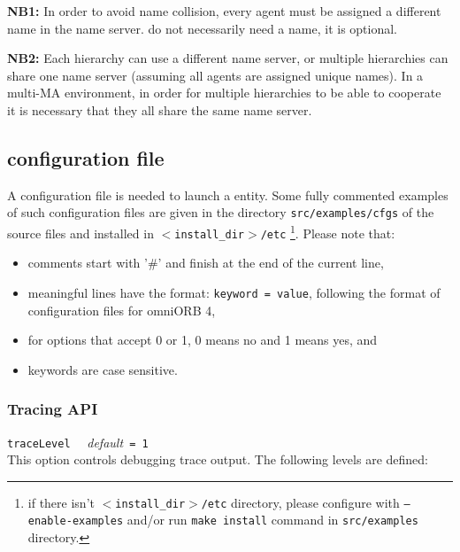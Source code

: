\textbf{NB1:} In order to avoid name collision, every agent must be  assigned a
different name in the name server.  \seds do not necessarily need a name, it is
optional.


\textbf{NB2:} Each \diet hierarchy can use a different name server, or multiple
hierarchies can share one name server (assuming all agents are assigned  unique
names). In a multi-MA environment, in order for multiple hierarchies to be able
to cooperate it is necessary that they all share the same name server.

\subsection{\diet configuration file}
\label{sec:diet_config_files}

A configuration file is needed to launch a \diet entity. Some fully commented
examples of such configuration files are given in the directory
\texttt{src/examples/cfgs} of the \diet source files and installed in
\texttt{$<$install\_dir$>$/etc} \footnote{if there isn't
  \texttt{$<$install\_dir$>$/etc} directory, please configure \diet with
  \texttt{--enable-examples} and/or run \texttt{make install} command in
  \texttt{src/examples} directory.}. Please note that:
\begin{itemize}
\item comments start with '\#' and finish at the end of the current line,
\item meaningful lines have the format: \texttt{keyword = value}, following the
  format of configuration files for omniORB 4,
\item for options that accept 0 or 1, 0 means no and 1 means yes, and
\item keywords are case sensitive.
\end{itemize}

\subsubsection{Tracing API}

\noindent
\texttt{traceLevel} \ \ \emph{default}\texttt{ = 1}\\ This option controls
debugging trace output. The following levels are defined:

